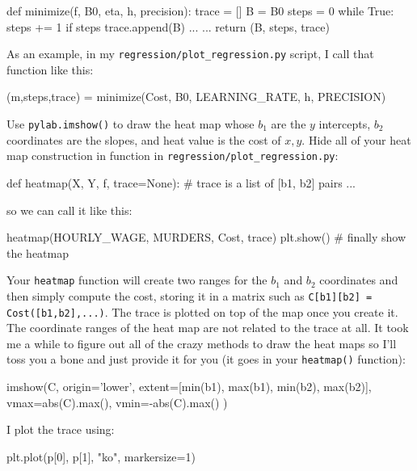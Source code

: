 \documentclass[titlepage]{tufte-book}
\begin{document}
\begin{fullwidth}
\begin{pyverbatim}
def minimize(f, B0, eta, h, precision):
    trace = []
    B = B0
    steps = 0 
    while True:
        steps += 1
        if steps %
            trace.append(B)
        ...     
    ... 
    return (B, steps, trace)
\end{pyverbatim}

\noindent As an example, in my {\tt regression/plot\_regression.py} script, I call that function like this:

\begin{pyverbatim}
(m,steps,trace) = minimize(Cost, B0, LEARNING_RATE, h, PRECISION)
\end{pyverbatim}

Use {\tt pylab.imshow()} to draw the heat map whose $b_1$ are the $y$ intercepts, $b_2$ coordinates are the slopes, and heat value is the cost of $x,y$.  Hide all of your heat map construction in function in {\tt regression/plot\_regression.py}:

\begin{pyverbatim}
def heatmap(X, Y, f, trace=None): # trace is a list of [b1, b2] pairs
    ...
\end{pyverbatim}

\noindent so we can call it like this:

\begin{pyverbatim}
heatmap(HOURLY_WAGE, MURDERS, Cost, trace)
plt.show() # finally show the heatmap
\end{pyverbatim}

Your {\tt heatmap} function will create two ranges for the $b_1$ and $b_2$ coordinates and then simply compute the cost,  storing it in a matrix such as {\tt C[b1][b2] = Cost([b1,b2],...)}.  The trace is plotted on top of the map once you create it. The coordinate ranges of the heat map are not related to the trace at all. It took me a while to figure out all of the crazy methods to draw the heat maps so I'll toss you a bone and just provide it for you (it goes in your {\tt heatmap()} function):

\begin{pyverbatim}
	imshow(C,
		   origin='lower',
		   extent=[min(b1), max(b1), min(b2), max(b2)],
		   vmax=abs(C).max(), vmin=-abs(C).max()
	)
\end{pyverbatim}

\noindent I plot the trace using:

\begin{pyverbatim}
plt.plot(p[0], p[1], "ko", markersize=1)
\end{pyverbatim}


\end{fullwidth}
\end{document}
